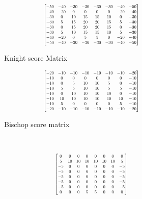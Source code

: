 \documentclass[a4paper,openany]{uantwerpenassignment}
\newcommand\scalemath[2]{\scalebox{#1}{\mbox{\ensuremath{\displaystyle #2}}}}
\begin{document}
\begin{figure}[h]
\begin{subfigure}{.3\textwidth}
    \end{subfigure}
    \begin{subfigure}{.3\textwidth}
        $$
        \scalemath{0.6}{
		\begin{bmatrix}
		-50& -40& -30& -30& -30& -30& -40& -50\\
		-40& -20& 0& 0& 0& 0& -20& -40\\
		-30& 0& 10& 15& 15& 10& 0& -30\\
		-30& 5& 15& 20& 20& 15& 5& -30\\
		-30& 0& 15& 20& 20& 15& 0& -30\\
		-30& 5& 10& 15& 15& 10& 5& -30\\
		-40& -20& 0& 5& 5& 0& -20& -40\\
		-50& -40& -30& -30& -30& -30& -40& -50
		\end{bmatrix}}
		$$
        \caption{Knight score Matrix}
    \end{subfigure}
    \begin{subfigure}{.3\textwidth}
    	$$
    	\scalemath{0.6}{
    	\begin{bmatrix}
   		-20& -10& -10& -10& -10& -10& -10& -20\\
		-10& 0& 0& 0& 0& 0& 0& -10\\
		-10& 0& 5& 10& 10& 5& 0& -10\\
		-10& 5& 5& 10& 10& 5& 5& -10\\
		-10& 0& 10& 10& 10& 10& 0& -10\\
		-10& 10& 10& 10& 10& 10& 10& -10\\
		-10& 5& 0& 0& 0& 0& 5& -10\\
		-20& -10& -10& -10& -10& -10& -10& -20
		\end{bmatrix}}
		$$
		\caption{Bischop score matrix}
    \end{subfigure}
    \\
    \begin{subfigure}{.3\textwidth}
    	$$
    	\scalemath{0.6}{
    	\begin{bmatrix}
   		0& 0& 0& 0& 0& 0& 0& 0\\
		5& 10& 10& 10& 10& 10& 10& 5\\
		-5& 0& 0& 0& 0& 0& 0& -5\\
		-5& 0& 0& 0& 0& 0& 0& -5\\
		-5& 0& 0& 0& 0& 0& 0& -5\\
		-5& 0& 0& 0& 0& 0& 0& -5\\
		-5& 0& 0& 0& 0& 0& 0& -5\\
		0& 0& 0& 5& 5& 0& 0& 0
		\end{bmatrix}}
$$
\end{subfigure}
\end{figure}
\end{document}
